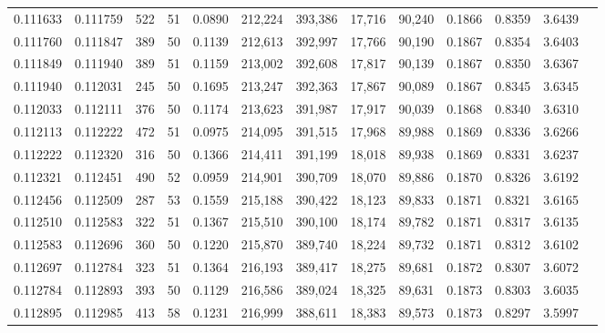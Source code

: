 \begin{tabular}{rrrrrrrrrrrrr}
0.111633 & 0.111759 &   522 &  51 &                                     0.0890 & 212,224 & 393,386 &  17,716 &  90,240 & 0.1866 & 0.8359 & 3.6439 \\
0.111760 & 0.111847 &   389 &  50 &                                     0.1139 & 212,613 & 392,997 &  17,766 &  90,190 & 0.1867 & 0.8354 & 3.6403 \\
0.111849 & 0.111940 &   389 &  51 &                                     0.1159 & 213,002 & 392,608 &  17,817 &  90,139 & 0.1867 & 0.8350 & 3.6367 \\
0.111940 & 0.112031 &   245 &  50 &                                     0.1695 & 213,247 & 392,363 &  17,867 &  90,089 & 0.1867 & 0.8345 & 3.6345 \\
0.112033 & 0.112111 &   376 &  50 &                                     0.1174 & 213,623 & 391,987 &  17,917 &  90,039 & 0.1868 & 0.8340 & 3.6310 \\
0.112113 & 0.112222 &   472 &  51 &                                     0.0975 & 214,095 & 391,515 &  17,968 &  89,988 & 0.1869 & 0.8336 & 3.6266 \\
0.112222 & 0.112320 &   316 &  50 &                                     0.1366 & 214,411 & 391,199 &  18,018 &  89,938 & 0.1869 & 0.8331 & 3.6237 \\
0.112321 & 0.112451 &   490 &  52 &                                     0.0959 & 214,901 & 390,709 &  18,070 &  89,886 & 0.1870 & 0.8326 & 3.6192 \\
0.112456 & 0.112509 &   287 &  53 &                                     0.1559 & 215,188 & 390,422 &  18,123 &  89,833 & 0.1871 & 0.8321 & 3.6165 \\
0.112510 & 0.112583 &   322 &  51 &                                     0.1367 & 215,510 & 390,100 &  18,174 &  89,782 & 0.1871 & 0.8317 & 3.6135 \\
0.112583 & 0.112696 &   360 &  50 &                                     0.1220 & 215,870 & 389,740 &  18,224 &  89,732 & 0.1871 & 0.8312 & 3.6102 \\
0.112697 & 0.112784 &   323 &  51 &                                     0.1364 & 216,193 & 389,417 &  18,275 &  89,681 & 0.1872 & 0.8307 & 3.6072 \\
0.112784 & 0.112893 &   393 &  50 &                                     0.1129 & 216,586 & 389,024 &  18,325 &  89,631 & 0.1873 & 0.8303 & 3.6035 \\
0.112895 & 0.112985 &   413 &  58 &                                     0.1231 & 216,999 & 388,611 &  18,383 &  89,573 & 0.1873 & 0.8297 & 3.5997 \\

\end{tabular}
